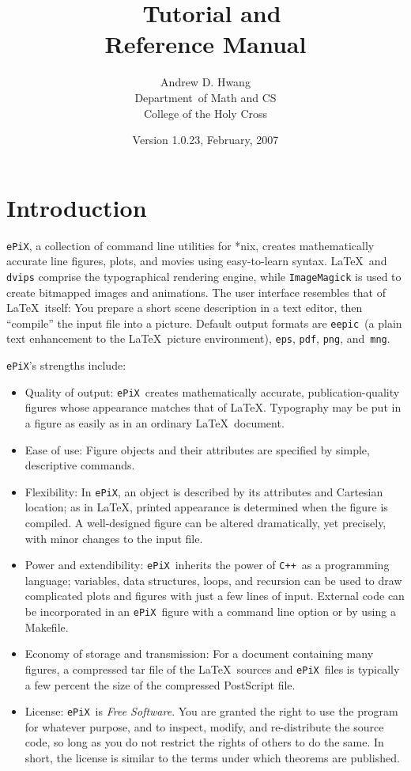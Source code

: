 \documentclass[12pt]{report}
\title{ \ePiX\ Tutorial and  \\ Reference Manual}
\author{Andrew D. Hwang \\ 
  Department\ of Math and CS \\ 
  College of the Holy Cross}
\date{Version 1.0.23,  February, 2007}
\newcommand{\code}[1]{\texttt{#1}}
\newcommand{\ePiX}{\code{ePiX}}
\newcommand{\eepic}{\code{eepic}}
\newcommand{\CXX}{\code{C++}}
\begin{document}
\maketitle

\tableofcontents

\chapter{Introduction}

\ePiX, a collection of command line utilities for *nix, creates
mathematically accurate line figures, plots, and movies using
easy-to-learn syntax. \LaTeX~and \code{dvips} comprise the
typographical rendering engine, while \code{ImageMagick} is used to
create bitmapped images and animations.  The user interface resembles
that of \LaTeX\ itself: You prepare a short scene description in a
text editor, then ``compile'' the input file into a picture. Default
output formats are \eepic\ (a plain text enhancement to the \LaTeX\
picture environment), \code{eps}, \code{pdf}, \code{png},
and~\code{mng}. 

\ePiX's strengths include:
 
\begin{itemize}
\item Quality of output: \ePiX\ creates mathematically accurate,
  publication-quality figures whose appearance matches that of \LaTeX.
  Typography may be put in a figure as easily as in an ordinary
  \LaTeX\ document.
  
\item Ease of use: Figure objects and their attributes are specified
  by simple, descriptive commands.
  
\item Flexibility: In \ePiX, an object is described by its attributes
  and Cartesian location; as in \LaTeX, printed appearance is
  determined when the figure is compiled. A well-designed figure can
  be altered dramatically, yet precisely, with minor changes to the
  input file.
  
\item Power and extendibility: \ePiX\ inherits the power of \CXX\ as a
  programming language; variables, data structures, loops, and
  recursion can be used to draw complicated plots and figures with
  just a few lines of input. External code can be incorporated in an
  \ePiX\ figure with a command line option or by using a Makefile.
  
\item Economy of storage and transmission: For a document containing
  many figures, a compressed tar file of the \LaTeX\ sources and
  \ePiX\ files is typically a few percent the size of the compressed
  PostScript file.
  
\item License: \ePiX\ is \emph{Free Software}.
  You are granted the right to use the program for whatever purpose,
  and to inspect, modify, and re-distribute the source code, so long
  as you do not restrict the rights of others to do the same. In
  short, the license is similar to the terms under which theorems are
  published.
  
\end{itemize}
\end{document}
